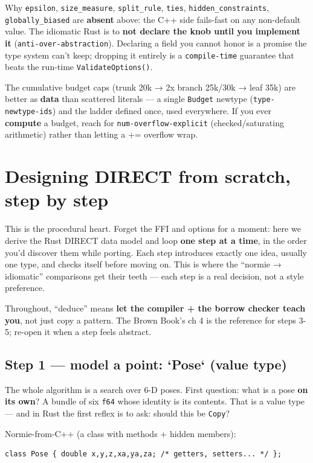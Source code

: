 \documentclass[11pt]{article}
\begin{document}
Why \texttt{epsilon}, \texttt{size\_measure}, \texttt{split\_rule}, \texttt{ties}, \texttt{hidden\_constraints},
\texttt{globally\_biased} are \textbf{absent} above: the C++ side fails-fast on any
non-default value. The idiomatic Rust is to \textbf{\textbf{not declare the knob until you
implement it}} (\texttt{anti-over-abstraction}). Declaring a field you cannot honor
is a promise the type system can't keep; dropping it entirely is a
\texttt{compile-time} guarantee that beats the run-time \texttt{ValidateOptions()}.

The cumulative budget caps (trunk 20k → 2x branch 25k/30k → leaf 35k) are
better as \textbf{\textbf{data}} than scattered literals — a single \texttt{Budget} newtype
(\texttt{type-newtype-ids}) and the ladder defined once, used everywhere. If you ever
\textbf{compute} a budget, reach for \texttt{num-overflow-explicit} (checked/saturating
arithmetic) rather than letting a += overflow wrap.
\section{Designing DIRECT from scratch, step by step}
\label{sec:org9315bce}

This is the procedural heart. Forget the FFI and options for a moment: here we
derive the Rust DIRECT data model and loop \textbf{one step at a time}, in the order
you'd discover them while porting. Each step introduces exactly one idea,
usually one type, and checks itself before moving on. This is where the
``normie → idiomatic'' comparisons get their teeth — each step is a real decision,
not a style preference.

Throughout, ``deduce'' means \textbf{let the compiler + the borrow checker teach you},
not just copy a pattern. The Brown Book's ch 4 is the reference for steps 3-5;
re-open it when a step feels abstract.
\subsection{Step 1 — model a point: `Pose` (value type)}
\label{sec:orgd39e1de}

The whole algorithm is a search over 6-D poses. First question: what is a pose
\textbf{on its own}? A bundle of six \texttt{f64} whose identity is its contents. That is a
value type — and in Rust the first reflex is to ask: should this be \texttt{Copy}?

Normie-from-C++ (a class with methods + hidden members):
\begin{verbatim}
class Pose { double x,y,z,xa,ya,za; /* getters, setters... */ };
\end{verbatim}
\end{document}
